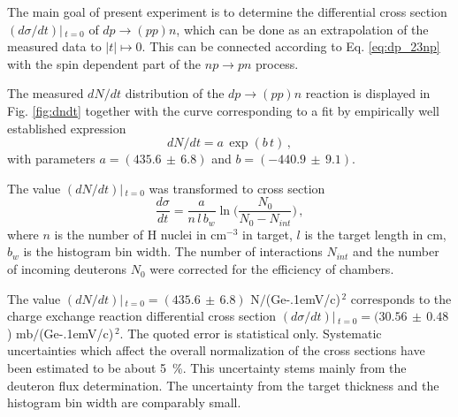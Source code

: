 \documentclass[twocolumn,epjc3]{svjour3}
\newcommand{\np}     {\ensuremath{np \rightarrow pn}\xspace}
\newcommand{\dpchex} {\ensuremath{dp \rightarrow (pp)n}\xspace}
\newcommand{\GeVc}   {Ge\kern-.1emV/c\xspace}
\begin{document}
The main goal of present experiment is to determine the differential cross
section $(d\sigma/dt)|\,_{t=0}$ of \dpchex, which can be done as an
extrapolation of the measured data to $|t|\mapsto0$. This can be connected according
to Eq. \eqref{eq:dp_23np} with the spin dependent part of the \np process.


The measured $dN/dt$ distribution of the \dpchex reaction is
displayed in Fig. \ref{fig:dndt} together with the curve corresponding to a fit
by empirically well established expression
\begin{equation}
  \label{eq:dndtfit}
  dN/dt = a\,\exp(b\,t)\,,
\end{equation}
with parameters $a=(435.6\,\pm\,6.8)$ and $b=(-440.9\,\pm\,9.1)$.

The value $(dN/dt)|\,_{t=0}$ was transformed to cross section
\begin{equation}
  \frac{d\sigma}{dt} =
  \frac{a}{n\,l\,b_w}\ln\bigg(\frac{N_0}{N_0-N_{int}}\bigg)\,,
\end{equation}
where $n$ is the number of H nuclei in cm$^{-3}$ in target, $l$ is the target
length in cm, $b_w$ is the histogram bin width. The number of interactions
$N_{int}$ and the number of incoming deuterons $N_0$ were corrected for the
efficiency of chambers.

The value $(dN/dt)|\,_{t=0}=(435.6\,\pm\,6.8)$ N$/$(\GeVc)$^{\,2}$ corresponds
to the charge exchange reaction differential cross section
$(d\sigma/dt)|\,_{t=0}=(30.56\,\pm\,0.48$) mb$/$(\GeVc)$^{\,2}$.
The quoted error is statistical only. Systematic uncertainties which
affect the overall normalization of the cross sections have been estimated to be
about 5~\%. This uncertainty stems mainly from the deuteron flux determination.
The uncertainty from the target thickness and the histogram bin width are
comparably small.
\end{document}
